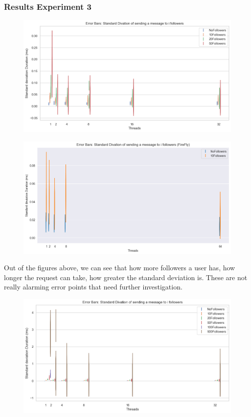 \documentclass[a4paper]{article}
\begin{document}
\subsubsection{Results Experiment 3}
\begin{figure}[H]
	\centering
	\includegraphics[width = \linewidth]{Images/ErrorBarsLatency.png}
	\caption{}
\end{figure}
\begin{figure}[H]
	\centering
	\includegraphics[width = \linewidth]{Images/ErrorBarsLatencyFireFly.png}
	\caption{}
\end{figure}
Out of the figures above, we can see that how more followers a user has, how longer the request can take, how greater the standard deviation is. These are not really alarming error points that need further investigation. 
\begin{figure}[H]
	\centering
	\includegraphics[width = \linewidth]{Images/ErrorBarsLatencyFull.png}
	\caption{}
\end{figure}
\end{document}
